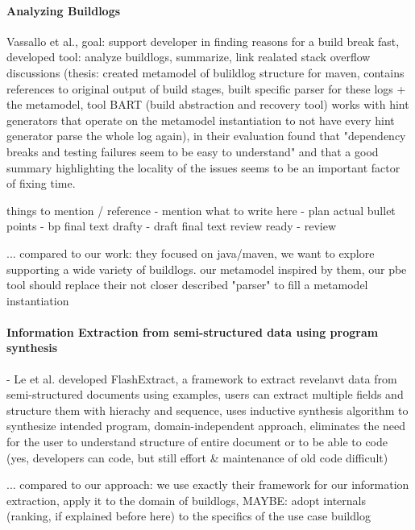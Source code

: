 \documentclass[\myrootdir/main.tex]{subfiles}
\begin{document}



\paragraph{Analyzing Buildlogs}
Vassallo et al., goal: support developer in finding reasons for a build break fast, developed tool: analyze buildlogs, summarize, link realated stack overflow discussions (thesis: created metamodel of bulildlog structure for maven, contains references to original output of build stages, built specific parser for these logs + the metamodel, tool BART (build abstraction and recovery tool) works with hint generators that operate on the metamodel instantiation to not have every hint generator parse the whole log again), in their evaluation found that "dependency breaks and testing failures seem to be easy to understand" and that a good summary highlighting the locality of the issues seems to be an important factor of fixing time. \cite{vassallo2018un-break}

things to mention / reference - mention
what to write here - plan
actual bullet points - bp
final text drafty - draft
final text review ready - review

... compared to our work: they focused on java/maven, we want to explore supporting a wide variety of buildlogs. our metamodel inspired by them, our pbe tool should replace their not closer described "parser" to fill a metamodel instantiation

\paragraph{Information Extraction from semi-structured data using program synthesis}
- Le et al. developed FlashExtract, a framework to extract revelanvt data from semi-structured documents using examples, users can extract multiple fields and structure them with hierachy and sequence, uses inductive synthesis algorithm to synthesize intended program, domain-independent approach, eliminates the need for the user to understand structure of entire document or to be able to code (yes, developers can code, but still effort \& maintenance of old code difficult)

... compared to our approach: we use exactly their framework for our information extraction, apply it to the domain of buildlogs, MAYBE: adopt internals (ranking, if explained before here) to the specifics of the use case buildlog 
\end{document}
